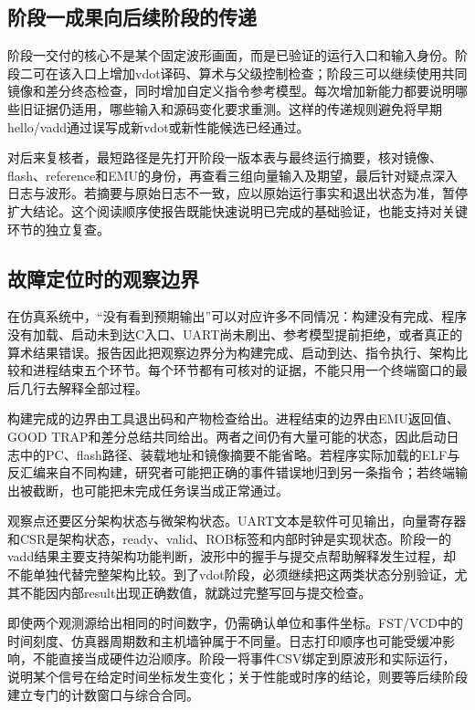 \subsection{阶段一成果向后续阶段的传递}


阶段一交付的核心不是某个固定波形画面，而是已验证的运行入口和输入身份。阶段二可在该入口上增加vdot译码、算术与父级控制检查；阶段三可以继续使用共同镜像和差分终态检查，同时增加自定义指令参考模型。每次增加新能力都要说明哪些旧证据仍适用，哪些输入和源码变化要求重测。这样的传递规则避免将早期hello/vadd通过误写成新vdot或新性能候选已经通过。\par


对后来复核者，最短路径是先打开阶段一版本表与最终运行摘要，核对镜像、flash、reference和EMU的身份，再查看三组向量输入及期望，最后针对疑点深入日志与波形。若摘要与原始日志不一致，应以原始运行事实和退出状态为准，暂停扩大结论。这个阅读顺序使报告既能快速说明已完成的基础验证，也能支持对关键环节的独立复查。\par


\subsection{故障定位时的观察边界}


在仿真系统中，“没有看到预期输出”可以对应许多不同情况：构建没有完成、程序没有加载、启动未到达C入口、UART尚未刷出、参考模型提前拒绝，或者真正的算术结果错误。报告因此把观察边界分为构建完成、启动到达、指令执行、架构比较和进程结束五个环节。每个环节都有可核对的证据，不能只用一个终端窗口的最后几行去解释全部过程。\par


构建完成的边界由工具退出码和产物检查给出。进程结束的边界由EMU返回值、GOOD TRAP和差分总结共同给出。两者之间仍有大量可能的状态，因此启动日志中的PC、flash路径、装载地址和镜像摘要不能省略。若程序实际加载的ELF与反汇编来自不同构建，研究者可能把正确的事件错误地归到另一条指令；若终端输出被截断，也可能把未完成任务误当成正常通过。\par


观察点还要区分架构状态与微架构状态。UART文本是软件可见输出，向量寄存器和CSR是架构状态，ready、valid、ROB标签和内部时钟是实现状态。阶段一的vadd结果主要支持架构功能判断，波形中的握手与提交点帮助解释发生过程，却不能单独代替完整架构比较。到了vdot阶段，必须继续把这两类状态分别验证，尤其不能因内部result出现正确数值，就跳过完整写回与提交检查。\par


即使两个观测源给出相同的时间数字，仍需确认单位和事件坐标。FST/VCD中的时间刻度、仿真器周期数和主机墙钟属于不同量。日志打印顺序也可能受缓冲影响，不能直接当成硬件边沿顺序。阶段一将事件CSV绑定到原波形和实际运行，说明某个信号在给定时间坐标发生变化；关于性能或时序的结论，则要等后续阶段建立专门的计数窗口与综合合同。\par


